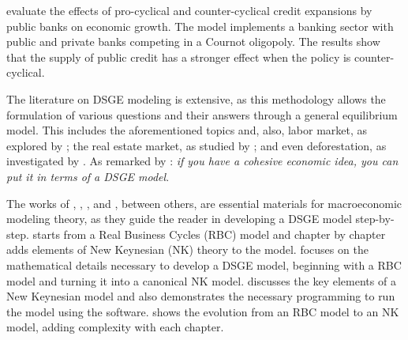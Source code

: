\documentclass[../thesis.tex]{subfiles}
\begin{document}
\textcite{capeleti_countercyclical_2022} evaluate the effects of pro-cyclical and counter-cyclical credit expansions by public banks on economic growth. The model implements a banking sector with public and private banks competing in a Cournot oligopoly. The results show that the supply of public credit has a stronger effect when the policy is counter-cyclical.


The literature on DSGE modeling is extensive, as this methodology allows the formulation of various questions and their answers through a general equilibrium model. This includes the aforementioned topics and, also, labor market, as explored by \textcite{ribeiro_alongamento_2023}; the real estate market, as studied by \textcite{albuquerquemello_mercado_2018}; and even deforestation, as investigated by \textcite{pereira_desmatamento_2013}. As remarked by \textcite{solis-garcia_ucb_2022}: \textit{if you have a cohesive economic idea, you can put it in terms of a DSGE model}. %

The works of \textcite{costa_junior_understanding_2016}, \textcite{solis-garcia_ucb_2022}, \textcite{bergholt_basic_2012}, and \textcite{gali_monetary_2015}, between others, are essential materials for macroeconomic modeling theory, as they guide the reader in developing a DSGE model step-by-step. \textcite{costa_junior_understanding_2016} starts from a Real Business Cycles (RBC) model and chapter by chapter adds elements of New Keynesian (NK) theory to the model. \textcite{solis-garcia_ucb_2022} focuses on the mathematical details necessary to develop a DSGE model, beginning with a RBC model and turning it into a canonical NK model. \textcite{bergholt_basic_2012} discusses the key elements of a New Keynesian model and also demonstrates the necessary programming to run the model using the \dynare{} software. \textcite{gali_monetary_2015} shows the evolution from an RBC model to an NK model, adding complexity with each chapter.


\end{document}
